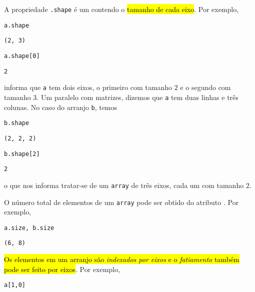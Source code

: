 A propriedade \lstinline+.shape+ é um {\PYTHONtuple} contendo o \hl{tamanho de cada eixo}. Por exemplo,

\begin{lstlisting}
a.shape
\end{lstlisting}

\begin{verbatim}
(2, 3)
\end{verbatim}

\begin{lstlisting}
a.shape[0]
\end{lstlisting}

\begin{verbatim}
2
\end{verbatim}


informa que \lstinline+a+ tem dois eixos, o primeiro com tamanho $2$ e o segundo com tamanho $3$. Um paralelo com matrizes, dizemos que \lstinline+a+ tem duas linhas e três colunas. No caso do arranjo \lstinline+b+, temos

\begin{lstlisting}
b.shape
\end{lstlisting}

\begin{verbatim}
(2, 2, 2)
\end{verbatim}

\begin{lstlisting}
b.shape[2]
\end{lstlisting}

\begin{verbatim}
2
\end{verbatim}

o que nos informa tratar-se de um \lstinline+array+ de três eixos, cada um com tamanho $2$.

O número total de elementos de um \lstinline+array+ pode ser obtido do atributo {\PYTHONnumpyDOTndarrayDOTsize}. Por exemplo,

\begin{lstlisting}
a.size, b.size
\end{lstlisting}

\begin{verbatim}
(6, 8)
\end{verbatim}

\hl{Os elementos em um arranjo são \emph{indexados por eixos} e o \emph{fatiamento} também pode ser feito por eixos}. Por exemplo,

\begin{lstlisting}
a[1,0]
\end{lstlisting}

